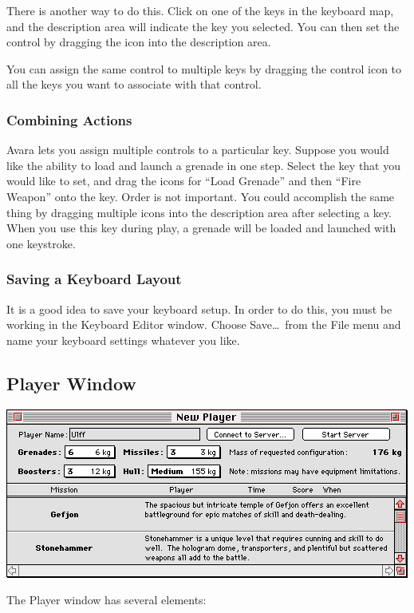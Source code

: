 \documentclass{article}
\begin{document}
There is another way to do this. Click on one of the keys in the keyboard map, and the description area will indicate the key you selected. You can then set the control by dragging the icon into the description area.

You can assign the same control to multiple keys by dragging the control icon to all the keys you want to associate with that control.

\subsubsection{Combining Actions}
Avara lets you assign multiple controls to a particular key. Suppose you would like the ability to load and launch a grenade in one step. Select the key that you would like to set, and drag the icons for ``Load Grenade'' and then ``Fire Weapon'' onto the key. Order is not important. You could accomplish the same thing by dragging multiple icons into the description area after selecting a key. When you use this key during play, a grenade will be loaded and launched with one keystroke.

\subsubsection{Saving a Keyboard Layout}
It is a good idea to save your keyboard setup. In order to do this, you must be working in the Keyboard Editor window. Choose Save\dots\ from the File menu and name your keyboard settings whatever you like.

\subsection{Player Window}
\begin{center}
	\includegraphics[width=\textwidth]{img/04.png}
\end{center}

The Player window has several elements:
\end{document}

